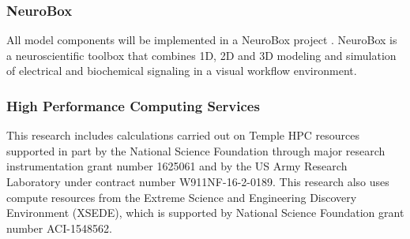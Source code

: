 \documentclass[12pt]{article}
\begin{document}
\subsubsection*{NeuroBox}
All model components will be implemented in a NeuroBox project \cite{Stepniewski2019,10.3389/fnana.2016.00008}.
NeuroBox is a neuroscientific toolbox that combines 1D, 2D and 3D modeling and simulation
of electrical and biochemical signaling in a visual workflow environment.



\subsubsection*{High Performance Computing Services} %
This research includes calculations carried out on Temple HPC resources supported in part by the National Science Foundation through major research instrumentation grant number 1625061 and by the US Army Research Laboratory under contract number W911NF-16-2-0189. This research also uses compute resources from the Extreme Science and Engineering Discovery Environment (XSEDE), which is supported by National Science Foundation grant number ACI-1548562. 
\clearpage


\end{document}
